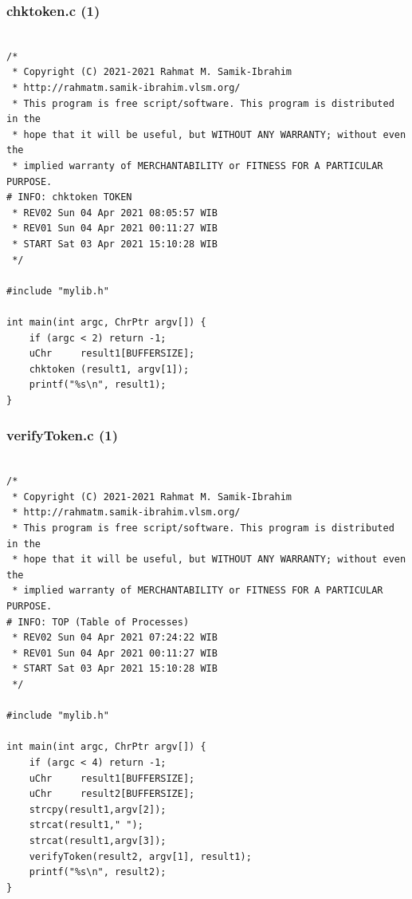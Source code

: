 \documentclass[aspectratio=169, xcolor=table, notheorems, hyperref={pdfpagelabels=false}]{beamer}
\begin{document}
\begin{frame}[fragile]
\frametitle{chktoken.c (1)}
\begin{lstlisting}[basicstyle=\ttfamily\tiny]         % 108

/*
 * Copyright (C) 2021-2021 Rahmat M. Samik-Ibrahim
 * http://rahmatm.samik-ibrahim.vlsm.org/
 * This program is free script/software. This program is distributed in the 
 * hope that it will be useful, but WITHOUT ANY WARRANTY; without even the 
 * implied warranty of MERCHANTABILITY or FITNESS FOR A PARTICULAR PURPOSE.
# INFO: chktoken TOKEN
 * REV02 Sun 04 Apr 2021 08:05:57 WIB
 * REV01 Sun 04 Apr 2021 00:11:27 WIB
 * START Sat 03 Apr 2021 15:10:28 WIB
 */

#include "mylib.h"

int main(int argc, ChrPtr argv[]) {
    if (argc < 2) return -1;
    uChr     result1[BUFFERSIZE];
    chktoken (result1, argv[1]);
    printf("%s\n", result1);
}

\end{lstlisting}
\end{frame}

\begin{frame}[fragile]
\frametitle{verifyToken.c (1)}
\begin{lstlisting}[basicstyle=\ttfamily\tiny]         % 108

/*
 * Copyright (C) 2021-2021 Rahmat M. Samik-Ibrahim
 * http://rahmatm.samik-ibrahim.vlsm.org/
 * This program is free script/software. This program is distributed in the 
 * hope that it will be useful, but WITHOUT ANY WARRANTY; without even the 
 * implied warranty of MERCHANTABILITY or FITNESS FOR A PARTICULAR PURPOSE.
# INFO: TOP (Table of Processes)
 * REV02 Sun 04 Apr 2021 07:24:22 WIB
 * REV01 Sun 04 Apr 2021 00:11:27 WIB
 * START Sat 03 Apr 2021 15:10:28 WIB
 */

#include "mylib.h"

int main(int argc, ChrPtr argv[]) {
    if (argc < 4) return -1;
    uChr     result1[BUFFERSIZE];
    uChr     result2[BUFFERSIZE];
    strcpy(result1,argv[2]);
    strcat(result1," ");
    strcat(result1,argv[3]);
    verifyToken(result2, argv[1], result1);
    printf("%s\n", result2);
}

\end{lstlisting}
\end{frame}
\end{document}
